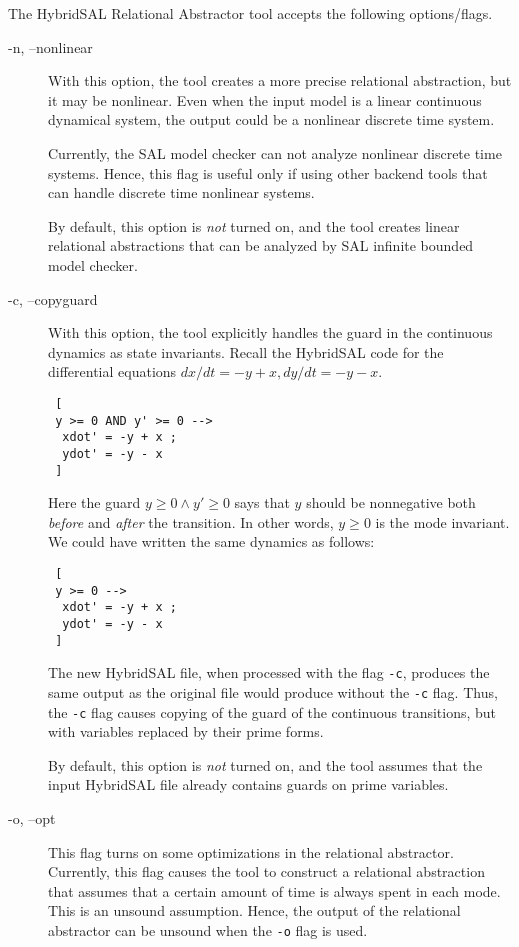 \documentclass{article}
\begin{document}
The HybridSAL Relational Abstractor tool accepts the following options/flags.
\begin{description}
\item[-n, --nonlinear]
 With this option, the tool creates a more precise relational abstraction,
 but it may be nonlinear.  Even when the input model is a linear
 continuous dynamical system, the output could be a nonlinear discrete
 time system.
 
 Currently, the SAL model checker can not analyze nonlinear discrete time
 systems.  Hence, this flag is useful only if using other backend tools
 that can handle discrete time nonlinear systems.

 By default, this option is {\em{not}} turned on, and the tool
 creates linear relational abstractions that can be analyzed by SAL
 infinite bounded model checker.

\item[-c, --copyguard]
 With this option, the tool explicitly handles the guard in the 
 continuous dynamics as state invariants.
 Recall the HybridSAL code for the differential equations
 $dx/dt = -y+x, dy/dt = -y-x$.
 \begin{tt}
 \begin{verbatim}
 [
 y >= 0 AND y' >= 0 --> 
  xdot' = -y + x ;
  ydot' = -y - x
 ]
 \end{verbatim}
 \end{tt}
 Here the guard $y \geq 0 \wedge y'\geq 0$ says that $y$ should be
 nonnegative both {\em{before}} and {\em{after}} the transition.
 In other words, $y\geq 0$ is the mode invariant.
 We could have written the same dynamics as follows:
 \begin{tt}
 \begin{verbatim}
 [
 y >= 0 --> 
  xdot' = -y + x ;
  ydot' = -y - x
 ]
 \end{verbatim}
 \end{tt}
 The new HybridSAL file, when processed with the flag {\tt{-c}},
 produces the same output as the original file would produce 
 without the {\tt{-c}} flag.
 Thus, the {\tt{-c}} flag causes copying of the guard 
 of the continuous transitions, but
 with variables replaced by their prime forms.

 By default, this option is {\em{not}} turned on, and the tool
 assumes that the input HybridSAL file already 
 contains guards on prime variables.

\item[-o, --opt]
 This flag turns on some optimizations in the relational
 abstractor.
 Currently, this flag causes the tool to construct a 
 relational abstraction that assumes that a certain amount
 of time is always spent in each mode.  This is an
 unsound assumption.  Hence, the output of the relational
 abstractor can be unsound when the {\tt{-o}} flag is used.
 

\end{description}
\end{document}
